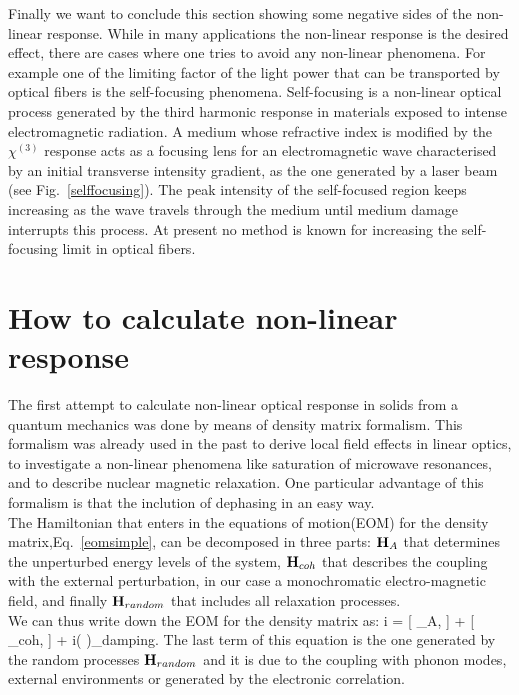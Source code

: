 Finally we want to conclude this section showing some negative sides of the non-linear response. While in many applications the non-linear response is the desired effect, there are cases where one tries to avoid any non-linear phenomena. 
For example one of the limiting factor of the light power that can be transported by optical fibers is the self-focusing phenomena. Self-focusing is a non-linear optical process generated by the third harmonic response in materials exposed to intense electromagnetic radiation. 
A medium whose refractive index is modified by the $\chi^{(3)}$ response acts as a focusing lens for an electromagnetic wave characterised by an initial transverse intensity gradient, as the one generated by a laser beam (see Fig.~\ref{selffocusing}). 
The peak intensity of the self-focused region keeps increasing as the wave travels through the medium until medium damage interrupts this process. At present no method is known for increasing the self-focusing limit in optical fibers\cite{encylaser}.
\section{How to calculate non-linear response}
The first attempt to calculate non-linear optical response in solids from a quantum mechanics was done by means of density matrix formalism.\cite{bloembergen1964quantum} This formalism was already used in the past to derive local field effects in linear optics\cite{PhysRev.126.413,wiser1963dielectric}, to investigate  a non-linear phenomena like saturation of microwave resonances\cite{karplus1948note}, and to describe nuclear magnetic relaxation\cite{kubo1954general,RevModPhys.33.249,PhysRev.102.104}.              
One particular advantage of this formalism is that the inclution of dephasing in an easy way.\\  
The Hamiltonian that enters in the equations of motion(EOM) for the density matrix\cite{neumann},Eq.~\ref{eomsimple}, can be decomposed in three parts:   ${\bf H}_A$ that determines the unperturbed energy levels of the system, ${\bf H}_{coh}$ that describes the coupling  with the external perturbation, in our case a monochromatic electro-magnetic field, and finally ${\bf H}_{random}$ that includes all relaxation processes.\\
We can thus write down the EOM for the density matrix as:
\be
i \hbar {} = [ \HH_A, \rho] + [ \HH_{coh}, \rho] + i\hbar \left (  \right )_{damping}.
\label{eomsimple}
\ee
The last term of this equation is the one generated by the random processes  ${\bf H}_{random}$ and it is due to the coupling with phonon modes, external environments or generated by the electronic correlation. 

